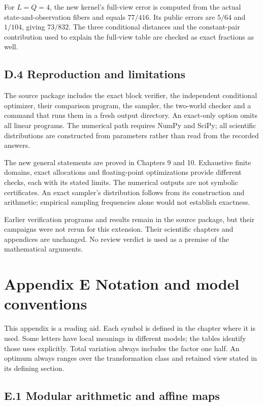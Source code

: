 \documentclass[
]{article}
\begin{document}
For \(L=Q=4\), the new kernel's full-view error is computed from the
actual state-and-observation fibers and equals \(77/416\). Its public
errors are \(5/64\) and \(1/104\), giving \(73/832\). The three
conditional distances and the constant-pair contribution used to explain
the full-view table are checked as exact fractions as well.

\subsection{D.4 Reproduction and
limitations}\label{d.4-reproduction-and-limitations}

The source package includes the exact block verifier, the independent
conditional optimizer, their comparison program, the sampler, the
two-world checker and a command that runs them in a fresh output
directory. An exact-only option omits all linear programs. The numerical
path requires NumPy and SciPy; all scientific distributions are
constructed from parameters rather than read from the recorded answers.

The new general statements are proved in Chapters 9 and 10. Exhaustive
finite domains, exact allocations and floating-point optimizations
provide different checks, each with its stated limits. The numerical
outputs are not symbolic certificates. An exact sampler's distribution
follows from its construction and arithmetic; empirical sampling
frequencies alone would not establish exactness.

Earlier verification programs and results remain in the source package,
but their campaigns were not rerun for this extension. Their scientific
chapters and appendices are unchanged. No review verdict is used as a
premise of the mathematical arguments.

\section{Appendix E Notation and model
conventions}\label{appendix-e-notation-and-model-conventions}

This appendix is a reading aid. Each symbol is defined in the chapter
where it is used. Some letters have local meanings in different models;
the tables identify those uses explicitly. Total variation always
includes the factor one half. An optimum always ranges over the
transformation class and retained view stated in its defining section.

\subsection{E.1 Modular arithmetic and affine
maps}\label{e.1-modular-arithmetic-and-affine-maps}
\end{document}
